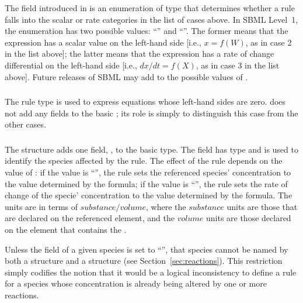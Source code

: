 \documentclass[10pt]{cekarticle}
\newcommand{\changed}[1]{\textcolor{BrickRed}{#1}}
\newenvironment{blockChanged}{\color{BrickRed}}{}
\begin{document}
The  field introduced in  is an
enumeration of type  that determines whether a rule falls
into the \changed{scalar or rate categories} in the list of cases above.
In SBML Level~1, the enumeration has two possible values:
``'' and ``''.  The former means that the
expression has a scalar value on the left-hand side [i.e., \changed{$x =
  f(W)$}, as in case 2 in the list above]; the latter means that the
expression has a rate of change differential on the left-hand side
\changed{[i.e., $dx/dt = f(X)$, as in case 3 in the list above]}.  Future
releases of SBML may add to the possible values of .


\subsubsection{}

The rule type  is used to express equations whose
left-hand sides are zero.   does not add any fields to
the basic ; its role is simply to distinguish this case from
the other cases.


\subsubsection{}

The  structure adds one field,
\changed{}, to the basic  type.  The
field \changed{} has type  and is used to
identify the \changed{species} affected by the rule.  The effect of the
rule depends on the value of : if the value is
``'', the rule sets the referenced \changed{species}'
concentration to the value determined by the formula; if the value is
``'', the rule sets the rate of change of the \changed{specie}'
concentration to the value determined by the formula.  The units are in
terms of $substance/volume$, where the $substance$ units are those that are
declared on the referenced  element, and the $volume$ units
are those declared on the  element that contains the
.

\begin{blockChanged}
  Unless the  field of a given species is set to
  ``'', that species cannot be named by both a
   structure and a 
  structure (see Section~\ref{sec:reactions}).  This restriction simply
  codifies the notion that it would be a logical inconsistency to define a
  rule for a species whose concentration is already being altered by one or
  more reactions.
\end{blockChanged}
\end{document}
